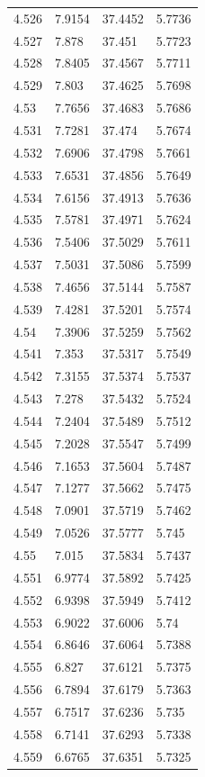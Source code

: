 \begin{tabular}{llll}
4.526 & 7.9154 & 37.4452 & 5.7736 \\
4.527 & 7.878 & 37.451 & 5.7723 \\
4.528 & 7.8405 & 37.4567 & 5.7711 \\
4.529 & 7.803 & 37.4625 & 5.7698 \\
4.53 & 7.7656 & 37.4683 & 5.7686 \\
4.531 & 7.7281 & 37.474 & 5.7674 \\
4.532 & 7.6906 & 37.4798 & 5.7661 \\
4.533 & 7.6531 & 37.4856 & 5.7649 \\
4.534 & 7.6156 & 37.4913 & 5.7636 \\
4.535 & 7.5781 & 37.4971 & 5.7624 \\
4.536 & 7.5406 & 37.5029 & 5.7611 \\
4.537 & 7.5031 & 37.5086 & 5.7599 \\
4.538 & 7.4656 & 37.5144 & 5.7587 \\
4.539 & 7.4281 & 37.5201 & 5.7574 \\
4.54 & 7.3906 & 37.5259 & 5.7562 \\
4.541 & 7.353 & 37.5317 & 5.7549 \\
4.542 & 7.3155 & 37.5374 & 5.7537 \\
4.543 & 7.278 & 37.5432 & 5.7524 \\
4.544 & 7.2404 & 37.5489 & 5.7512 \\
4.545 & 7.2028 & 37.5547 & 5.7499 \\
4.546 & 7.1653 & 37.5604 & 5.7487 \\
4.547 & 7.1277 & 37.5662 & 5.7475 \\
4.548 & 7.0901 & 37.5719 & 5.7462 \\
4.549 & 7.0526 & 37.5777 & 5.745 \\
4.55 & 7.015 & 37.5834 & 5.7437 \\
4.551 & 6.9774 & 37.5892 & 5.7425 \\
4.552 & 6.9398 & 37.5949 & 5.7412 \\
4.553 & 6.9022 & 37.6006 & 5.74 \\
4.554 & 6.8646 & 37.6064 & 5.7388 \\
4.555 & 6.827 & 37.6121 & 5.7375 \\
4.556 & 6.7894 & 37.6179 & 5.7363 \\
4.557 & 6.7517 & 37.6236 & 5.735 \\
4.558 & 6.7141 & 37.6293 & 5.7338 \\
4.559 & 6.6765 & 37.6351 & 5.7325 \\

\end{tabular}
